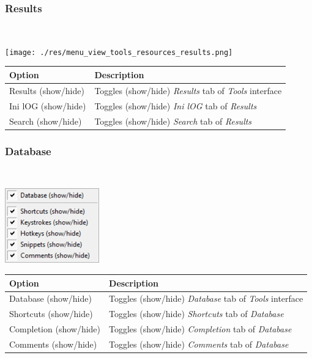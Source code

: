 \hypertarget{menu_view_tools_resources_results}{}
\subsubsection{Results}\\

\texttt{[image: ./res/menu\_view\_tools\_resources\_results.png]}\\

\begin{scriptsize}
  \begin{tabularx}{\textwidth}{>{\hsize=0.3\hsize}X>{\hsize=0.7\hsize}X}\\
    \hline
    \textbf{Option} & \textbf{Description} \\
    \hline
    Results (show/hide) & Toggles (show/hide) \textit{Results} tab of \textit{Tools} interface \\
    Ini lOG (show/hide) & Toggles (show/hide) \textit{Ini lOG} tab of \textit{Results} \\
    Search (show/hide) & Toggles (show/hide) \textit{Search} tab of \textit{Results} \\
    \hline
  \end{tabularx}
\end{scriptsize}


\hypertarget{menu_view_tools_resources_database}{}
\subsubsection{Database}\\

\includegraphics[scale=0.50]{./res/menu_view_tools_resources_database.png}\\

\begin{scriptsize}
  \begin{tabularx}{\textwidth}{>{\hsize=0.3\hsize}X>{\hsize=0.7\hsize}X}\\
    \hline
    \textbf{Option} & \textbf{Description} \\
    \hline
    Database (show/hide) & Toggles (show/hide) \textit{Database} tab of \textit{Tools} interface \\
    Shortcuts (show/hide) & Toggles (show/hide) \textit{Shortcuts} tab of \textit{Database} \\
    Completion (show/hide) & Toggles (show/hide) \textit{Completion} tab of \textit{Database} \\
    Comments (show/hide) & Toggles (show/hide) \textit{Comments} tab of \textit{Database} \\
    \hline
  \end{tabularx}
\end{scriptsize}


